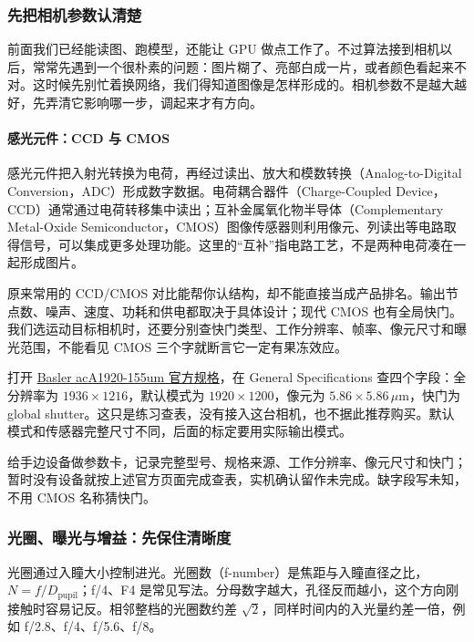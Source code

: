 \subsubsection{先把相机参数认清楚}
前面我们已经能读图、跑模型，还能让 GPU 做点工作了。不过算法接到相机以后，常常先遇到一个很朴素的问题：图片糊了、亮部白成一片，或者颜色看起来不对。这时候先别忙着换网络，我们得知道图像是怎样形成的。相机参数不是越大越好，先弄清它影响哪一步，调起来才有方向。

\paragraph*{感光元件：CCD 与 CMOS}
感光元件把入射光转换为电荷，再经过读出、放大和模数转换（Analog-to-Digital Conversion，ADC）形成数字数据。电荷耦合器件（Charge-Coupled Device，CCD）通常通过电荷转移集中读出；互补金属氧化物半导体（Complementary Metal-Oxide Semiconductor，CMOS）图像传感器则利用像元、列读出等电路取得信号，可以集成更多处理功能。这里的“互补”指电路工艺，不是两种电荷凑在一起形成图片。

原来常用的 CCD/CMOS 对比能帮你认结构，却不能直接当成产品排名。输出节点数、噪声、速度、功耗和供电都取决于具体设计；现代 CMOS 也有全局快门。我们选运动目标相机时，还要分别查快门类型、工作分辨率、帧率、像元尺寸和曝光范围，不能看见 CMOS 三个字就断言它一定有果冻效应。
\begin{example}[照着官方规格做一张参数卡]
打开 \href{https://docs.baslerweb.com/aca1920-155um}{Basler acA1920-155um 官方规格}，在 General Specifications 查四个字段：全分辨率为 $1936\times1216$，默认模式为 $1920\times1200$，像元为 $5.86\times5.86\,\mu$m，快门为 global shutter。这只是练习查表，没有接入这台相机，也不据此推荐购买。默认模式和传感器完整尺寸不同，后面的标定要用实际输出模式。
\end{example}
\begin{exercise}\label{ex:v2-camera-sensor}
给手边设备做参数卡，记录完整型号、规格来源、工作分辨率、像元尺寸和快门；暂时没有设备就按上述官方页面完成查表，实机确认留作未完成。缺字段写未知，不用 CMOS 名称猜快门。
\end{exercise}

\subsubsection{光圈、曝光与增益：先保住清晰度}
光圈通过入瞳大小控制进光。光圈数（f-number）是焦距与入瞳直径之比，$N=f/D_{\mathrm{pupil}}$；f/4、F4 是常见写法。分母数字越大，孔径反而越小，这个方向刚接触时容易记反。相邻整档的光圈数约差 $\sqrt2$，同样时间内的入光量约差一倍，例如 f/2.8、f/4、f/5.6、f/8。

